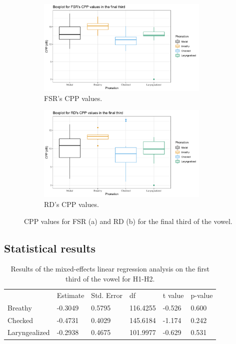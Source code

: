 \documentclass[12pt, letterpaper]{article}
\providecommand{\lsptoprule}{\midrule\toprule}
\providecommand{\lspbottomrule}{\bottomrule\midrule}
\begin{document}
\begin{figure}[!ht]
	\centering
	\begin{subfigure}{.5\textwidth}
		\centering
		\includegraphics[width=0.9\textwidth]{../mean_FSR_cpp_third.png}
		\caption{FSR's CPP values.}
		\label{fig:FSRcppthird} 
	\end{subfigure}%
	\begin{subfigure}{.5\textwidth}
		\centering
		\includegraphics[width=0.9\textwidth]{../mean_RD_cpp_third.png}
		\caption{RD's CPP values.}
		\label{fig:RDcppthird} 
	\end{subfigure}
	\caption{CPP values for FSR (a) and RD (b) for the final third of the vowel. }
	\label{fig:cppthird}
\end{figure}

\subsection{Statistical results} \label{sec:Stats}

\begin{table}[!h]
	\centering
	\caption{Results of the mixed-effects linear regression analysis on the first third of the vowel for H1-H2. }
	\label{tab:H1H2_First}
	 \begin{tabular}{llllll}
	  \lsptoprule
						&  Estimate  & Std. Error & df & t value & p-value \\
	  	Breathy   		&  -0.3049  &   0.5795 & 116.4255 &  -0.526  &  0.600 \\
		Checked    		&  -0.4731  &   0.4029 & 145.6184 &  -1.174  &  0.242 \\
		Laryngealized	&  -0.2938  &   0.4675 & 101.9977 &  -0.629  &  0.531 \\
	  \lspbottomrule
	 \end{tabular}
\end{table}
\end{document}
